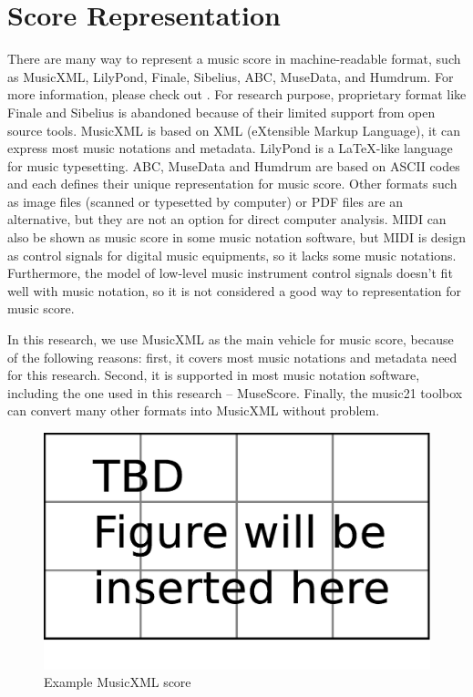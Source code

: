 \section{Score Representation}

There are many way to represent a music score in machine-readable format, such as MusicXML\cite{Good2001}, LilyPond\cite{LilyPond}, Finale, Sibelius, ABC, MuseData, and Humdrum. For more information, please check out \cite{Selfridge-Field1997}. For research purpose, proprietary format like Finale and Sibelius is abandoned because of their limited support from open source tools. MusicXML is based on XML (eXtensible Markup Language), it can express most music notations and metadata. LilyPond is a \LaTeX-like language for music typesetting. ABC, MuseData and Humdrum are based on ASCII codes and each defines their unique representation for music score. 
Other formats such as image files (scanned or typesetted by computer) or PDF files are an alternative, but they are not an option for direct computer analysis. MIDI can also be shown as music score in some music notation software, but MIDI is design as control signals for digital music equipments, so it lacks some music notations. Furthermore, the model of low-level music instrument control signals doesn't fit well with music notation, so it is not considered a good way to representation for music score.

In this research, we use MusicXML as the main vehicle for music score, because of the following reasons: first, it covers most music notations and metadata need for this research. Second, it is supported in most music notation software, including the one used in this research -- MuseScore. Finally, the music21 toolbox can convert many other formats into MusicXML without problem.
 

\begin{figure}[tp]
   \begin{center}
      \includegraphics[width=\textwidth]{fig/TBDFigure}

   \end{center}
   \caption{Example MusicXML score}
   \label{fig:expxml}
\end{figure}

